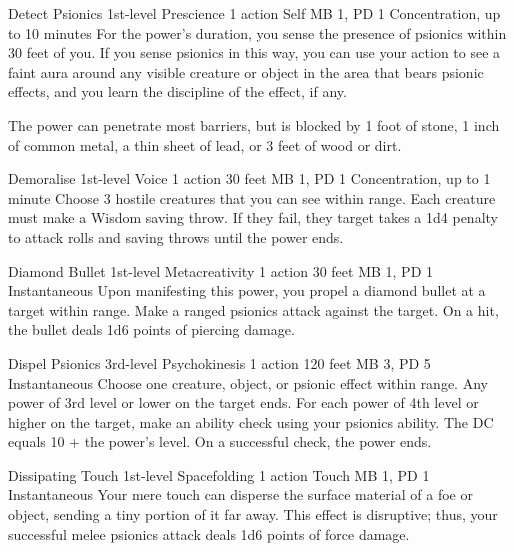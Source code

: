 \DndPowerHeader%
  {Detect Psionics}
  {1st-level Prescience}
  {1 action}
  {Self}
  {MB 1, PD 1}
  {Concentration, up to 10 minutes}
For the power's duration,
you sense the presence of psionics within 30 feet of you.
If you sense psionics in this way,
you can use your action to see a faint aura around
any visible creature or object in the area that bears psionic effects,
and you learn the discipline of the effect, if any.

The power can penetrate most barriers, but is blocked by
1 foot of stone,
1 inch of common metal,
a thin sheet of lead,
or 3 feet of wood or dirt.

\DndPowerHeader%
  {Demoralise}
  {1st-level Voice}
  {1 action}
  {30 feet}
  {MB 1, PD 1}
  {Concentration, up to 1 minute}
Choose 3 hostile creatures that you can see within range.
Each creature must make a Wisdom saving throw.
If they fail, they target takes a 1d4 penalty to attack rolls and
saving throws until the power ends.

\DndPowerHeader%
  {Diamond Bullet}
  {1st-level Metacreativity}
  {1 action}
  {30 feet}
  {MB 1, PD 1}
  {Instantaneous}
  Upon manifesting this power,
  you propel a diamond bullet at a target within range.
  Make a ranged psionics attack against the target.
  On a hit, the bullet deals 1d6 points of piercing damage.

\DndPowerHeader%
  {Dispel Psionics}
  {3rd-level Psychokinesis}
  {1 action}
  {120 feet}
  {MB 3, PD 5}
  {Instantaneous}
  Choose one creature, object, or psionic effect within range.
  Any power of 3rd level or lower on the target ends.
  For each power of 4th level or higher on the target,
  make an ability check using your psionics ability.
  The DC equals 10 + the power's level.
  On a successful check, the power ends.

\DndPowerHeader%
  {Dissipating Touch}
  {1st-level Spacefolding}
  {1 action}
  {Touch}
  {MB 1, PD 1}
  {Instantaneous}
Your mere touch can disperse the surface material of a foe or object,
sending a tiny portion of it far away.
This effect is disruptive; thus,
your successful melee psionics attack deals 1d6 points of force damage.

